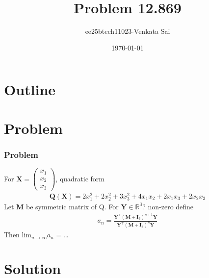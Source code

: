 \documentclass{beamer}
\title{Problem 12.869}
\author{ee25btech11023-Venkata Sai}
\date{\today}
\providecommand{\brak}[1]{\ensuremath{\left(#1\right)}}
\theoremstyle{remark}
\newcommand{\myvec}[1]{\ensuremath{\begin{pmatrix}#1\end{pmatrix}}}
\let\vec\mathbf
\numberwithin{equation}{section}
\begin{document}
\begin{frame}
\titlepage
\end{frame}

\section*{Outline}
\begin{frame}
\tableofcontents
\end{frame}

\section{Problem}

\begin{frame}
\frametitle{Problem}
For $\vec{X}=\myvec{x_1\\x_2\\x_3}$, quadratic form
\begin{align}
\vec{Q\brak{\vec{X}}} = 2x^2_1 + 2x^2_2 + 3x^2_3 + 4x_1x_2 + 2x_1x_3 + 2x_2x_3
\end{align}
Let $\vec{M}$ be symmetric matrix of Q. For $\vec{Y} \in \mathbb{R}^3$? non-zero define 
\begin{align}
    a_n=\frac{\vec{Y}^\top\brak{\vec{M}+\vec{I}_3}^{n+1}\vec{Y}}{\vec{Y}^\top\brak{\vec{M}+\vec{I}_3}^{n}\vec{Y}}
\end{align}
Then lim$_{n\rightarrow\infty}a_n$ = \dots  \\
\end{frame}
\section{Solution}

 
\end{document}
